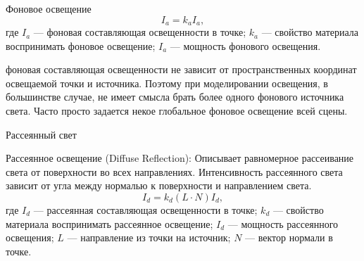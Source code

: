 \documentclass{beamer}
\begin{document}
	\begin{frame}{Фоновое освещение}
		\[
			I_a = k_a I_a
			,
		\]
		где 
		$I_a$ --- фоновая составляющая освещенности в точке;
		$k_a$ --- свойство материала воспринимать фоновое освещение;
		$I_a$ --- мощность фонового освещения.

		фоновая составляющая освещенности не зависит от пространственных координат освещаемой точки и источника. Поэтому при моделировании освещения, в большинстве случае, не имеет смысла брать более одного фонового источника света. Часто просто задается некое глобальное фоновое освещение всей сцены.
	\end{frame}

	\begin{frame}{Рассеянный свет}	

		Рассеянное освещение (Diffuse Reflection): Описывает равномерное рассеивание света от поверхности во всех направлениях. Интенсивность рассеянного света зависит от угла между нормалью к поверхности и направлением света.
		\[
			I_d %
			= k_d (L \cdot N) I_d
			,	
		\]
		где 
		$I_d$ --- рассеянная составляющая освещенности в точке;
		$k_d$ --- свойство материала воспринимать рассеянное освещение;
		$I_d$ --- мощность рассеянного освещения;
		$L$ --- направление из точки на источник;
		$N$ --- вектор нормали в точке.
	

	\end{frame}
\end{document}
